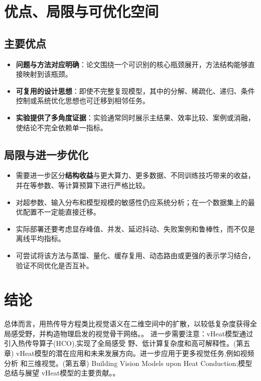 \documentclass[UTF8,11pt,a4paper]{ctexart}
\newcommand{\term}[1]{\textbf{\textcolor{mainblue}{#1}}}
\begin{document}
\section{优点、局限与可优化空间}
\subsection{主要优点}
\begin{itemize}
\item \term{问题与方法对应明确}：论文围绕一个可识别的核心瓶颈展开，方法结构能够直接映射到该瓶颈。
\item \term{可复用的设计思想}：即使不完整复现模型，其中的分解、稀疏化、递归、条件控制或系统优化思想也可迁移到相邻任务。
\item \term{实验提供了多角度证据}：实验通常同时展示主结果、效率比较、案例或消融，使结论不完全依赖单一指标。
\end{itemize}

\subsection{局限与进一步优化}
\begin{itemize}
\item 需要进一步区分\term{结构收益}与更大算力、更多数据、不同训练技巧带来的收益，并在等参数、等计算预算下进行严格比较。
\item 对超参数、输入分布和模型规模的敏感性仍应系统分析；在一个数据集上的最优配置不一定能直接迁移。
\item 实际部署还要考虑显存峰值、并发、延迟抖动、失败案例和鲁棒性，而不仅是离线平均指标。
\item 可尝试将该方法与蒸馏、量化、缓存复用、动态路由或更强的表示学习结合，验证不同优化是否互补。
\end{itemize}

\section{结论}
总体而言，用热传导方程类比视觉语义在二维空间中的扩散，以较低复杂度获得全局感受野，并构造物理启发的视觉骨干网络。。 进一步需要注意：vHeat模型通过引入热传导算子(HCO),实现了全局感受 野、低计算复杂度和高可解释性。(第五章) vHeat模型的潜在应用和未来发展方向。进一步应用于更多视觉任务,例如视频分析 和三维视觉。(第五章) Building Vision Models upon Heat Conduction;模型总结与展望 vHeat模型的主要贡献。。
\end{document}
